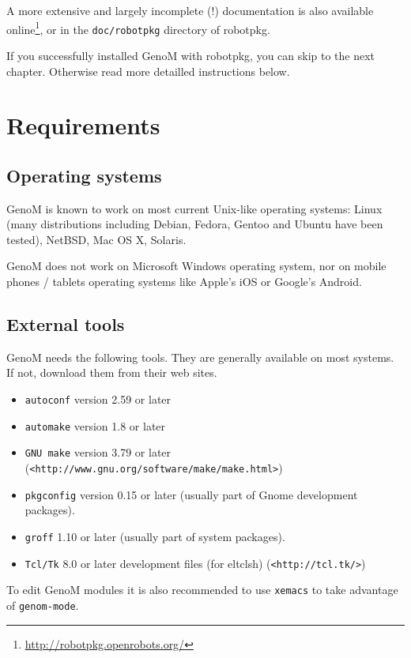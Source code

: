 A more extensive and largely incomplete (!) documentation is also
available
online\footnote{\url{http://robotpkg.openrobots.org/}},
or in the \texttt{doc/robotpkg} directory of robotpkg. 

If you successfully installed GenoM with robotpkg, you can skip to the
next chapter. Otherwise read more detailled instructions below.

\section{Requirements}
\label{sec|configuration|requirements}

\subsection{Operating systems}

GenoM is known to work on most current Unix-like operating systems:
Linux (many distributions including Debian, Fedora, Gentoo and Ubuntu
have been tested), NetBSD, Mac OS X, Solaris.

GenoM does not work on Microsoft Windows operating system, nor on
mobile phones / tablets operating systems like Apple's iOS or Google's
Android. 

\subsection{External tools}

GenoM needs the following tools.
They are generally available on most systems. If not, download
them from their web sites. 

\begin{itemize}
\item \texttt{autoconf} version 2.59 or later
\item \texttt{automake} version 1.8 or later
\item \texttt{GNU make} version 3.79 or later  (\texttt{<http://www.gnu.org/software/make/make.html>})
\item \texttt{pkgconfig} version 0.15 or later (usually part of Gnome development packages).
\item \texttt{groff} 1.10 or later (usually part of system packages).
\item \texttt{Tcl/Tk} 8.0 or later development files (for eltclsh) (\texttt{<http://tcl.tk/>})
\end{itemize}

To edit GenoM modules it is also recommended to use \texttt{xemacs} to take
advantage of \texttt{genom-mode}.

